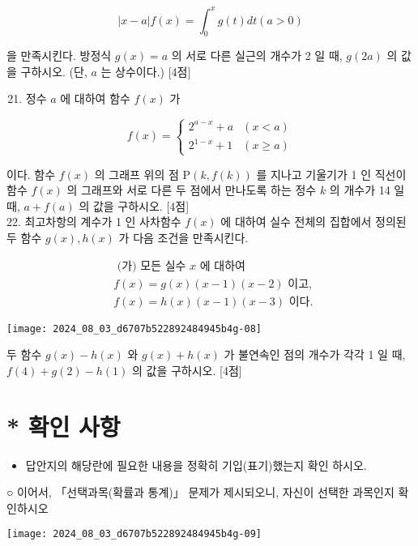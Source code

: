 \documentclass[10pt]{article}
\begin{document}
\[
|x-a| f(x)=\int_{0}^{x} g(t) d t(a>0)
\]

을 만족시킨다. 방정식 \(g(x)=a\) 의 서로 다른 실근의 개수가 2 일 때, \(g(2 a)\) 의 값을 구하시오. (단, \(a\) 는 상수이다.) [4점]

\begin{enumerate}
  \setcounter{enumi}{20}
  \item 정수 \(a\) 에 대하여 함수 \(f(x)\) 가
\end{enumerate}

\[
f(x)= \begin{cases}2^{a-x}+a & (x<a) \\ 2^{1-x}+1 & (x \geq a)\end{cases}
\]

이다. 함수 \(f(x)\) 의 그래프 위의 점 \(\mathrm{P}(k, f(k))\) 를 지나고 기울기가 1 인 직선이 함수 \(f(x)\) 의 그래프와 서로 다른 두 점에서 만나도록 하는 정수 \(k\) 의 개수가 14 일 때, \(a+f(a)\) 의 값을 구하시오. [4점]\\
22. 최고차항의 계수가 1 인 사차함수 \(f(x)\) 에 대하여 실수 전체의 집합에서 정의된 두 함수 \(g(x), h(x)\) 가 다음 조건을 만족시킨다.

\[
\begin{aligned}
& \text { (가) 모든 실수 } x \text { 에 대하여 } \\
& f(x)=g(x)(x-1)(x-2) \text { 이고, } \\
& f(x)=h(x)(x-1)(x-3) \text { 이다. }
\end{aligned}
\]

\begin{center}
\texttt{[image: 2024\_08\_03\_d6707b522892484945b4g-08]}
\end{center}

두 함수 \(g(x)-h(x)\) 와 \(g(x)+h(x)\) 가 불연속인 점의 개수가 각각 1 일 때, \(f(4)+g(2)-h(1)\) 의 값을 구하시오. [4점]

\section*{* 확인 사항}
\begin{itemize}
  \item 답안지의 해당란에 필요한 내용을 정확히 기입(표기)했는지 확인 하시오.
\end{itemize}

○ 이어서, 「선택과목(확률과 통계)」 문제가 제시되오니, 자신이 선택한 과목인지 확인하시오

\begin{center}
\texttt{[image: 2024\_08\_03\_d6707b522892484945b4g-09]}
\end{center}
\end{document}
